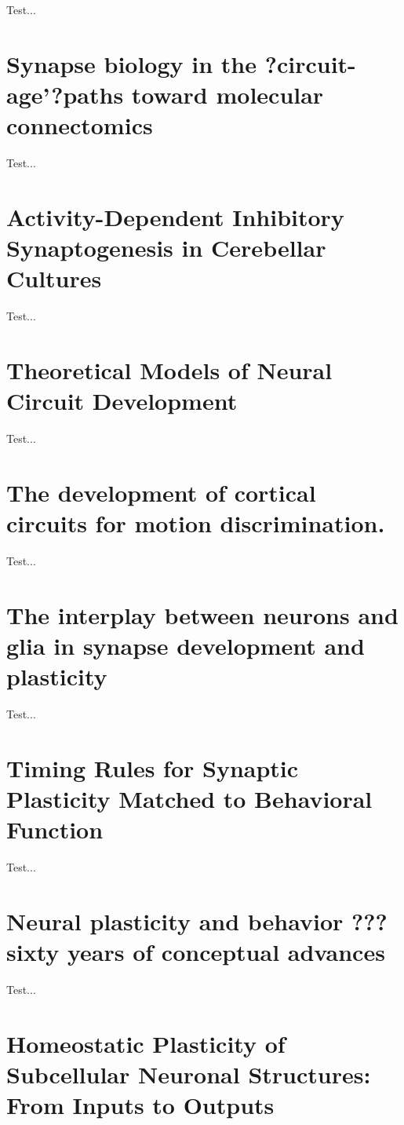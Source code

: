 \documentclass[11pt, a4paper, oneside]{article}   	%
\begin{document}
Test...

\section{Synapse biology in the ?circuit-age'?paths toward molecular connectomics \cite{Schreiner2017}}

Test...

\section{Activity-Dependent Inhibitory Synaptogenesis in Cerebellar Cultures \cite{Seil2016}}

Test...

\section{Theoretical Models of Neural Circuit Development \cite{Simpson2009}}

Test...

\section{The development of cortical circuits for motion discrimination. \cite{Smith2015}}

Test...

\section{The interplay between neurons and glia in synapse development and plasticity \cite{Stogsdill2017}}

Test...

\section{Timing Rules for Synaptic Plasticity Matched to Behavioral Function \cite{Suvrathan2016}}

Test...

\section{Neural plasticity and behavior ??? sixty years of conceptual advances \cite{Sweatt2016}}

Test...

\section{Homeostatic Plasticity of Subcellular Neuronal Structures: From Inputs to Outputs \cite{Wefelmeyer2016}}
\end{document}
